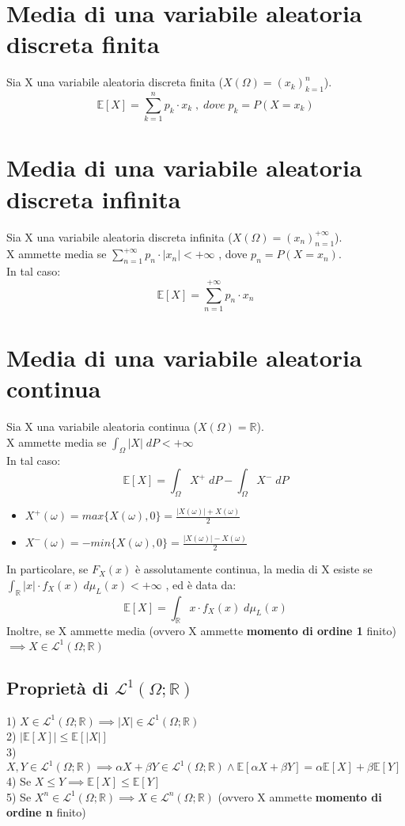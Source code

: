 \documentclass{article}
\begin{document}
\section*{Media di una variabile aleatoria discreta finita}
Sia X una variabile aleatoria discreta finita ($X(\Omega) = (x_{k})_{k=1}^{n}$).\\
\[ \mathbb{E}[X] = \sum_{k=1}^{n}p_{k}\cdot x_{k} \; , \; dove \; p_{k} = P(X = x_{k}) \]

\section*{Media di una variabile aleatoria discreta infinita}
Sia X una variabile aleatoria discreta infinita ($X(\Omega) = (x_{n})_{n=1}^{+\infty}$).\\
X ammette media se $\sum_{n=1}^{+\infty}p_{n}\cdot |x_{n}| < +\infty$ , dove $p_{n} = P(X = x_{n})$.\\
In tal caso:
\[ \mathbb{E}[X] = \sum_{n=1}^{+\infty}p_{n}\cdot x_{n} \]

\section*{Media di una variabile aleatoria continua}
Sia X una variabile aleatoria continua ($X(\Omega) = \mathbb{R}$).\\
X ammette media se $\int_{\Omega}^{}|X| \; dP < +\infty$\\
In tal caso:
\[ \mathbb{E}[X] = \int_{\Omega}^{}X^{+} \; dP - \int_{\Omega}^{}X^{-} \; dP \]
\begin{itemize}
\item $X^{+}(\omega) = max\{X(\omega), 0\} = \frac{|X(\omega)|+X(\omega)}{2}$
\item $X^{-}(\omega) = -min\{X(\omega), 0\} = \frac{|X(\omega)|-X(\omega)}{2}$
\end{itemize}
In particolare, se $F_{X}(x)$ è assolutamente continua, la media di X esiste se\\
$\int_{\mathbb{R}}^{}|x|\cdot f_{X}(x) \; d\mu_{L}(x) < +\infty$ , ed è data da:
\[ \mathbb{E}[X] = \int_{\mathbb{R}}^{}x\cdot f_{X}(x) \; d\mu_{L}(x) \]
Inoltre, se X ammette media (ovvero X ammette \textbf{momento di ordine 1} finito) $\implies X \in \mathcal{L}^{1}(\Omega; \mathbb{R})$

\subsection*{Proprietà di $\mathcal{L}^{1}(\Omega; \mathbb{R})$}
1) $X \in \mathcal{L}^{1}(\Omega; \mathbb{R}) \implies |X| \in \mathcal{L}^{1}(\Omega; \mathbb{R})$\\
2) $|\mathbb{E}[X]| \leq \mathbb{E}[|X|]$\\
3) $X,Y \in \mathcal{L}^{1}(\Omega; \mathbb{R}) \implies \alpha X+\beta Y \in \mathcal{L}^{1}(\Omega; \mathbb{R}) \wedge \mathbb{E}[\alpha X+\beta Y] = \alpha \mathbb{E}[X]+\beta \mathbb{E}[Y]$\\
4) Se $X \leq Y \implies \mathbb{E}[X] \leq \mathbb{E}[Y]$\\
5) Se $X^{n} \in \mathcal{L}^{1}(\Omega; \mathbb{R}) \implies X \in \mathcal{L}^{n}(\Omega; \mathbb{R})$ (ovvero X ammette \textbf{momento di ordine n} finito)
\end{document}
